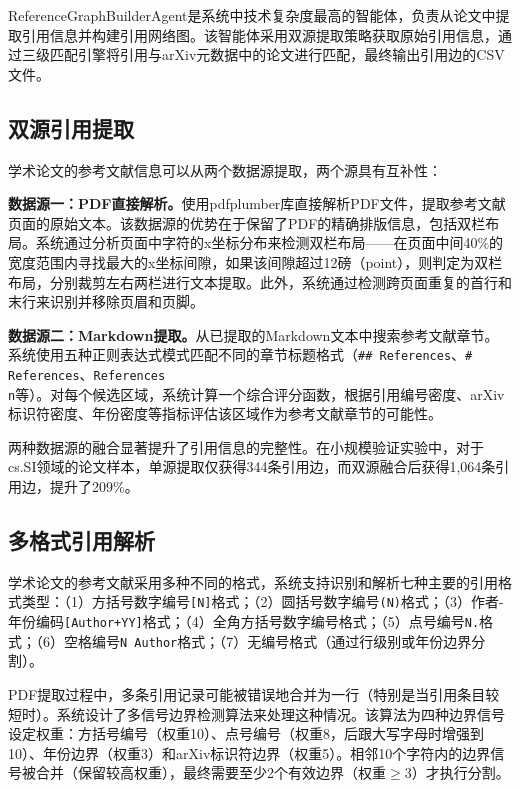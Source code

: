 ReferenceGraphBuilderAgent是系统中技术复杂度最高的智能体，负责从论文中提取引用信息并构建引用网络图。该智能体采用双源提取策略获取原始引用信息，通过三级匹配引擎将引用与arXiv元数据中的论文进行匹配，最终输出引用边的CSV文件。

\subsection{双源引用提取}

学术论文的参考文献信息可以从两个数据源提取，两个源具有互补性：

\textbf{数据源一：PDF直接解析。}使用pdfplumber库直接解析PDF文件，提取参考文献页面的原始文本。该数据源的优势在于保留了PDF的精确排版信息，包括双栏布局。系统通过分析页面中字符的x坐标分布来检测双栏布局——在页面中间40\%的宽度范围内寻找最大的x坐标间隙，如果该间隙超过12磅（point），则判定为双栏布局，分别裁剪左右两栏进行文本提取。此外，系统通过检测跨页面重复的首行和末行来识别并移除页眉和页脚。

\textbf{数据源二：Markdown提取。}从已提取的Markdown文本中搜索参考文献章节。系统使用五种正则表达式模式匹配不同的章节标题格式（\texttt{\#\# References}、\texttt{\# References}、\texttt{References\\n}等）。对每个候选区域，系统计算一个综合评分函数，根据引用编号密度、arXiv标识符密度、年份密度等指标评估该区域作为参考文献章节的可能性。

两种数据源的融合显著提升了引用信息的完整性。在小规模验证实验中，对于cs.SI领域的论文样本，单源提取仅获得344条引用边，而双源融合后获得1,064条引用边，提升了209\%。

\subsection{多格式引用解析}

学术论文的参考文献采用多种不同的格式，系统支持识别和解析七种主要的引用格式类型：（1）方括号数字编号\texttt{[N]}格式；（2）圆括号数字编号\texttt{(N)}格式；（3）作者-年份编码\texttt{[Author+YY]}格式；（4）全角方括号数字编号格式；（5）点号编号\texttt{N.}格式；（6）空格编号\texttt{N Author}格式；（7）无编号格式（通过行级别或年份边界分割）。

PDF提取过程中，多条引用记录可能被错误地合并为一行（特别是当引用条目较短时）。系统设计了多信号边界检测算法来处理这种情况。该算法为四种边界信号设定权重：方括号编号（权重10）、点号编号（权重8，后跟大写字母时增强到10）、年份边界（权重3）和arXiv标识符边界（权重5）。相邻10个字符内的边界信号被合并（保留较高权重），最终需要至少2个有效边界（权重$\geq$3）才执行分割。

